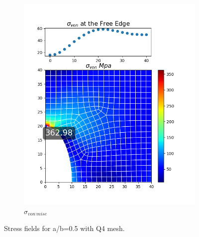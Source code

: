 \documentclass[twoside,twocolumn,10pt]{article}
\begin{document}
\begin{figure}[!ht]
\begin{subfigure}[c]{0.26\textwidth}
    \includegraphics[width=1.\linewidth]{Q2_5/Q5_0.5_von_quad.png}
    \caption{$\sigma_{von \, mise}$}
    \label{fig:von_quad_0.5}
  \end{subfigure}
  \caption{Stress fields for a/b=0.5 with Q4 mesh.}
  \label{fig:quad_0.5}
\end{figure}
\end{document}
